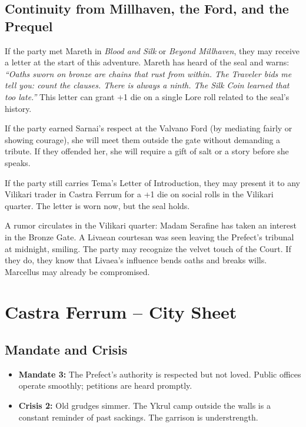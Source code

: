 \documentclass[10pt,twoside]{book}
\begin{document}
\section{Continuity from Millhaven, the Ford, and the Prequel}

If the party met Mareth in \textit{Blood and Silk} or \textit{Beyond Millhaven}, they may receive a letter at the start of this adventure. Mareth has heard of the seal and warns: \textit{``Oaths sworn on bronze are chains that rust from within. The Traveler bids me tell you: count the clauses. There is always a ninth. The Silk Coin learned that too late.''} This letter can grant +1 die on a single Lore roll related to the seal's history.

If the party earned Sarnai's respect at the Valvano Ford (by mediating fairly or showing courage), she will meet them outside the gate without demanding a tribute. If they offended her, she will require a gift of salt or a story before she speaks.

If the party still carries Tema's Letter of Introduction, they may present it to any Vilikari trader in Castra Ferrum for a +1 die on social rolls in the Vilikari quarter. The letter is worn now, but the seal holds.

\begin{sidebar}
A rumor circulates in the Vilikari quarter: Madam Serafine has taken an interest in the Bronze Gate. A Livaean courtesan was seen leaving the Prefect's tribunal at midnight, smiling. The party may recognize the velvet touch of the Court. If they do, they know that Livaea's influence bends oaths and breaks wills. Marcellus may already be compromised.
\end{sidebar}

\chapter{Castra Ferrum -- City Sheet}

\section{Mandate and Crisis}

\begin{itemize}
\item \textbf{Mandate 3:} The Prefect's authority is respected but not loved. Public offices operate smoothly; petitions are heard promptly.
\item \textbf{Crisis 2:} Old grudges simmer. The Ykrul camp outside the walls is a constant reminder of past sackings. The garrison is understrength.
\end{itemize}
\end{document}
